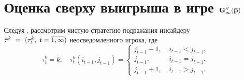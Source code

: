 {\section{Оценка сверху выигрыша в игре $\mathbf{G^\beta_\infty(\p)}$}
Следуя \cite{domansky11}, рассмотрим чистую стратегию подражания инсайдеру $\tauv^k~=~(\tau^k_t,\ t = \overline{1, \infty})$ неосведомленного игрока, где
\begin{equation*}
  \tau^k_1 = k, \quad
  \tau^k_t(i_{t-1}, j_{t-1}) = \begin{cases}
    j_{t-1} - 1, &\; i_{t-1} < j_{t-1},\\
    j_{t-1}, &\; i_{t-1} = j_{t-1},\\
    j_{t-1}+1, &\; i_{t-1} > j_{t-1}.
  \end{cases}
\end{equation*}

}
